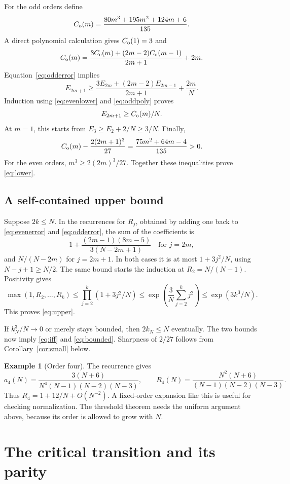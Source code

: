 \documentclass[11pt]{article}
\theoremstyle{definition}
\newtheorem{example}[theorem]{Example}
\theoremstyle{remark}
\newcommand{\1}{\mathbf 1}
\begin{document}
For the odd orders define
\[
C_{\rm o}(m)=\frac{80m^3+195m^2+124m+6}{135}.
\]
A direct polynomial calculation gives $C_{\rm o}(1)=3$ and
\begin{equation}\label{eq:oddpoly}
C_{\rm o}(m)=\frac{3C_{\rm e}(m)+(2m-2)C_{\rm o}(m-1)}{2m+1}+2m.
\end{equation}
Equation~\eqref{eq:odderror} implies
\[
E_{2m+1}\ge\frac{3E_{2m}+(2m-2)E_{2m-1}}{2m+1}+\frac{2m}N.
\]
Induction using \eqref{eq:evenlower} and \eqref{eq:oddpoly} proves
\begin{equation}\label{eq:oddlower}
E_{2m+1}\ge C_{\rm o}(m)/N.
\end{equation}
At $m=1$, this starts from $E_3\ge E_2+2/N\ge3/N$. Finally,
\[
C_{\rm o}(m)-\frac{2(2m+1)^3}{27}
=\frac{75m^2+64m-4}{135}>0.
\]
For the even orders, $m^3\ge2(2m)^3/27$. Together these inequalities prove \eqref{eq:lower}.

\subsection{A self-contained upper bound}

Suppose $2k\le N$. In the recurrences for $R_j$, obtained by adding one back to \eqref{eq:evenerror} and \eqref{eq:odderror}, the sum of the coefficients is
\[
1+\frac{(2m-1)(8m-5)}{3(N-2m+1)}
\quad\text{for }j=2m,
\]
and $N/(N-2m)$ for $j=2m+1$. In both cases it is at most $1+3j^2/N$, using $N-j+1\ge N/2$. The same bound starts the induction at $R_2=N/(N-1)$. Positivity gives
\[
\max(1,R_2,\ldots,R_k)
\le\prod_{j=2}^k(1+3j^2/N)
\le\exp\left(\frac3N\sum_{j=2}^k j^2\right)
\le\exp(3k^3/N).
\]
This proves \eqref{eq:upper}.

If $k_N^3/N\to0$ or merely stays bounded, then $2k_N\le N$ eventually. The two bounds now imply \eqref{eq:iff} and \eqref{eq:bounded}. Sharpness of $2/27$ follows from Corollary~\ref{cor:small} below.

\begin{example}[Order four]
The recurrence gives
\[
a_4(N)=\frac{3(N+6)}{N^4(N-1)(N-2)(N-3)},\qquad
R_4(N)=\frac{N^2(N+6)}{(N-1)(N-2)(N-3)}.
\]
Thus $R_4=1+12/N+O(N^{-2})$. A fixed-order expansion like this is useful for checking normalization. The threshold theorem needs the uniform argument above, because its order is allowed to grow with $N$.
\end{example}


\clearpage
\section{The critical transition and its parity}\label{sec:critical}
\end{document}
